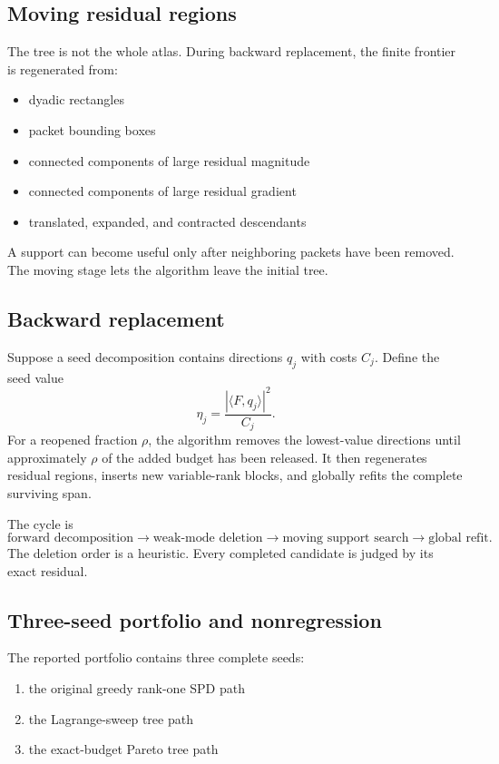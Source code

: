 \documentclass[11pt]{article}
\theoremstyle{definition}
\theoremstyle{remark}
\begin{document}
\FloatBarrier
\subsection{Moving residual regions}
The tree is not the whole atlas. During backward replacement, the finite frontier is regenerated from:
\begin{itemize}
\item dyadic rectangles
\item packet bounding boxes
\item connected components of large residual magnitude
\item connected components of large residual gradient
\item translated, expanded, and contracted descendants
\end{itemize}
A support can become useful only after neighboring packets have been removed. The moving stage lets the algorithm leave the initial tree.

\FloatBarrier
\subsection{Backward replacement}
Suppose a seed decomposition contains directions $q_j$ with costs $C_j$. Define the seed value
\[
\eta_j=\frac{|\langle F,q_j\rangle|^2}{C_j}.
\]
For a reopened fraction $\rho$, the algorithm removes the lowest-value directions until approximately $\rho$ of the added budget has been released. It then regenerates residual regions, inserts new variable-rank blocks, and globally refits the complete surviving span.

The cycle is
\[
\boxed{
\text{forward decomposition}
\longrightarrow
\text{weak-mode deletion}
\longrightarrow
\text{moving support search}
\longrightarrow
\text{global refit}.
}
\]
The deletion order is a heuristic. Every completed candidate is judged by its exact residual.

\FloatBarrier
\subsection{Three-seed portfolio and nonregression}
The reported portfolio contains three complete seeds:

\begin{enumerate}
\item the original greedy rank-one SPD path
\item the Lagrange-sweep tree path
\item the exact-budget Pareto tree path
\end{enumerate}
\end{document}
